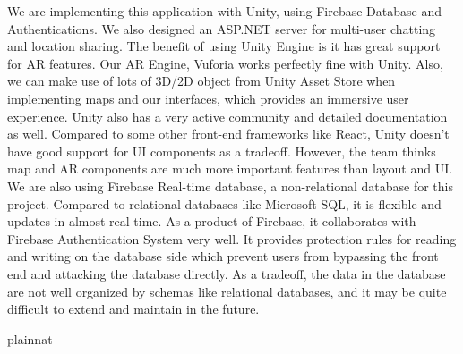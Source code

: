 \documentclass[12pt, titlepage]{article}
\begin{document}
\begin{enumerate}
  We are implementing this application with Unity, using Firebase Database and Authentications. We also designed an ASP.NET server for multi-user chatting and location sharing.
  The benefit of using Unity Engine is it has great support for AR features. Our AR Engine, Vuforia works perfectly fine with Unity.  Also, we can make use of lots of 3D/2D object from Unity Asset Store when implementing maps and our interfaces, which provides an immersive user experience.  Unity also has a very active community and detailed documentation as well.  Compared to some other front-end frameworks like React, Unity doesn't have good support for UI components as a tradeoff. However, the team thinks map and AR components are much more important features than layout and UI.
  	We are also using Firebase Real-time database, a non-relational database for this project. Compared to relational databases like Microsoft SQL,  it is flexible and updates in almost real-time. As a product of Firebase, it collaborates with Firebase Authentication System very well. It provides protection rules for reading and writing on the database side which prevent users from bypassing the front end and attacking the database directly. As a tradeoff, the data in the database are not well organized by schemas like relational databases, and it may be quite difficult to extend and maintain in the future.
\end{enumerate}

\newpage
 {plainnat}


\newpage{}
\end{document}
